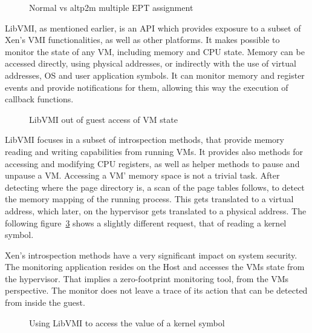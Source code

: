 \begin{figure}[ht]
	\centering
	\scalebox{0.95}{}
	\caption{Normal vs altp2m multiple \ac{EPT} assignment}
	\label{fig:ept}
\end{figure}

\par LibVMI, as mentioned earlier, is an \ac{API} which provides exposure to a subset of Xen’s \ac{VMI} functionalities, as well as other platforms. It makes possible to monitor the state of any \ac{VM}, including memory and \ac{CPU} state. Memory can be accessed directly, using physical addresses, or indirectly with the use of virtual addresses, \ac{OS} and user application symbols. It can monitor memory and register events and provide notifications for them, allowing this way the execution of callback functions. 


\begin{figure}[ht]
	\centering
	
	\caption{LibVMI out of guest access of \ac{VM} state}
	\label{fig:libvmi}
\end{figure}

\par LibVMI focuses in a subset of introspection methods, that provide memory reading and writing capabilities from running \ac{VM}s. It provides also methods for accessing and modifying \ac{CPU} registers, as well as helper methods to pause and unpause a \ac{VM}. Accessing a \ac{VM}' memory space is not a trivial task. After detecting where the page directory is, a scan of the page tables follows, to detect the memory mapping of the running process. This gets translated to a virtual address, which later, on the hypervisor gets translated to a physical address. The following figure~\ref{fig:accesskernel} shows a slightly different request, that of reading a kernel symbol.

\par Xen’s introspection methods have a very significant impact on system security. The monitoring application resides on the Host and accesses the \ac{VM}s state from the hypervisor. That implies a zero-footprint monitoring tool, from the \ac{VM}s perspective. The monitor does not leave a trace of its action that can be detected from inside the guest.

\begin{figure}[ht]
	\centering
	
	\caption{Using LibVMI to access the value of a kernel symbol}
	\label{fig:accesskernel}
\end{figure}

